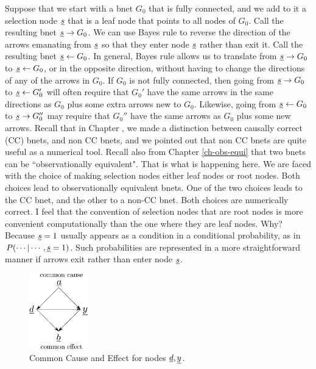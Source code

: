 Suppose that we start with
a bnet $G_0$ that is fully connected, and 
we add to it a selection node ${\underline{s}}$ 
that is a leaf node that points
to all nodes of $G_0$.
Call the resulting bnet ${\underline{s}}\rightarrow G_0$.
We can use Bayes rule to reverse the direction
of the arrows emanating from ${\underline{s}}$
so that they enter node ${\underline{s}}$ 
rather than exit
it.
Call the resulting bnet ${\underline{s}}\leftarrow G_0$.
In general,
Bayes rule allows us to translate 
from ${\underline{s}}\rightarrow G_0$ to 
${\underline{s}}\leftarrow G_0$,
or in the opposite direction,
without having to change the 
directions of any of the arrows in $G_0$.
If $G_0$ is not fully connected, then
going from
${\underline{s}}\rightarrow G_0$ to 
${\underline{s}}\leftarrow G_0'$ 
will often require that $G_0'$
have the same arrows in the same
directions as $G_0$
plus some extra arrows
new to $G_0$.
Likewise, going
from
${\underline{s}}\leftarrow G_0$ to 
${\underline{s}}\rightarrow G_0''$
may require that $G_0''$ have
the same arrows as $G_0$ plus some new arrows.
Recall that in Chapter ,
we made a distinction
between causally correct (CC)
bnets, and non CC bnets, and
we pointed out
that non CC bnets are
quite useful as
a numerical tool.
Recall also from Chapter
\ref{ch-obs-equi}
that two bnets can be 
``observationally equivalent".
That is what is happening here.
We are faced with 
the choice of
making selection nodes
either 
leaf nodes or root nodes.
Both
choices  lead to observationally
equivalent bnets.
One of the two choices
leads to the 
CC bnet,
and the other to a non-CC bnet.
Both choices are numerically
correct. I feel that
the convention 
of selection
nodes that are root nodes is 
more convenient 
computationally
than the one where they 
are leaf nodes. Why?
Because
${\underline{s}}=1$
usually 
appears as a condition in a conditional
probability,
as in $P(\cdots|\cdots, {\underline{s}}=1)$.
Such probabilities
are represented  in a more
straightforward manner if arrows
exit rather than enter node
${\underline{s}}$. 


\begin{figure}[h!]
\centering
\includegraphics[width=1in]
{sb-removal/common-cause-effect.png}
\caption{Common Cause 
and Effect for 
nodes ${\underline{d}},{\underline{y}}$.} 
\label{fig-common-cause-effect}
\end{figure}

